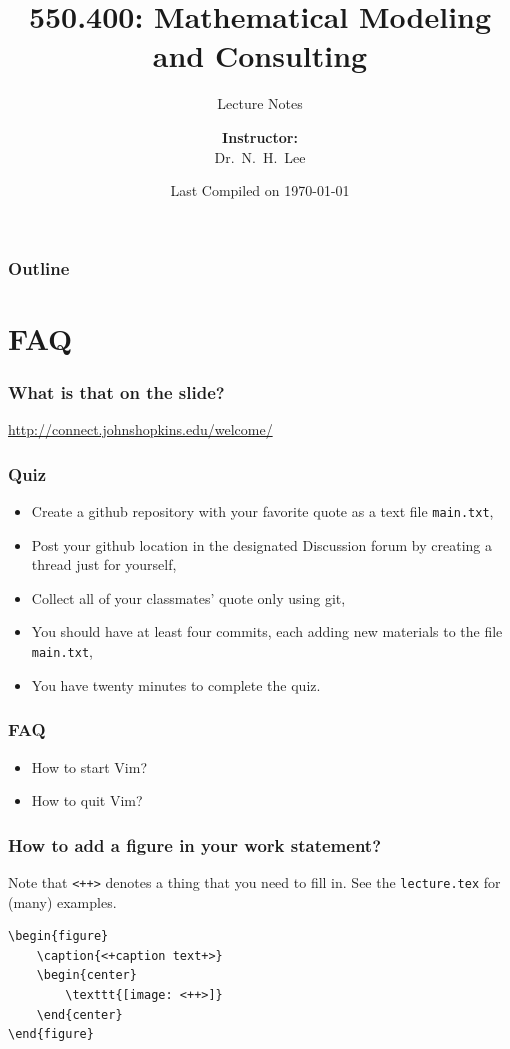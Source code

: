 \documentclass[hyperref={colorlinks=false},handout,10pt]{beamer}
\title{{\color{blue} \LARGE 550.400: Mathematical Modeling and Consulting\newline} }
\subtitle{{\color{red} \large Lecture Notes} }
\author{ 
    {\bf{Instructor:}} \\ 
Dr.~N.~H.~Lee \\ 
    \vspace{5pt}
}
\institute{JHU AMS 2012 FALL}
\date{\mygreen Last Compiled on \today}
\let\olditem\item
\renewcommand{\item}{\setlength{\itemsep}{0.5\baselineskip}\olditem}
\begin{document}
\begin{frame}[plain]
  \titlepage
\end{frame}

\begin{frame}%
  \frametitle{Outline}
  \tableofcontents
\end{frame}

\section{FAQ} 

\begin{frame}
    \frametitle{What is that on the slide?}
    \begin{center}
        \Large
        \href{http://connect.johnshopkins.edu/welcome/}{http://connect.johnshopkins.edu/welcome/}
\end{center}
\end{frame}

\begin{frame}
    \frametitle{Quiz}
    \begin{itemize}
        \item Create a github repository with your favorite quote as a text
            file \texttt{main.txt},
        \item Post your github location in the designated Discussion forum 
            by creating a thread just for yourself,
        \item Collect all of your classmates' quote only using git,
        \item You should have at least four commits, each adding new materials
            to the file \texttt{main.txt},
        \item You have twenty minutes to complete the quiz.
    \end{itemize}
\end{frame}

\begin{frame}
    \frametitle{FAQ}
    \begin{itemize}
        \item How to start Vim? 
        \item How to quit Vim?
    \end{itemize}
\end{frame}



\begin{frame}[fragile]
    \frametitle{How to add a figure in your work statement?}
        Note that \verb$<++>$ denotes a thing that you need to fill in.
        See the \texttt{lecture.tex} for (many) examples.
        \vskip0.1in
    \begin{lstlisting}
\begin{figure}
    \caption{<+caption text+>}
    \begin{center}
        \texttt{[image: <++>]}
    \end{center}
\end{figure}
    \end{lstlisting}
\end{frame}
\end{document}

